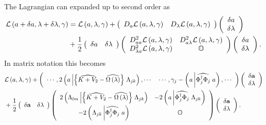 \documentclass[aps,preprint]{revtex4}%
\begin{document}
The Lagrangian can expanded up to second order as
\begin{align}
\mathcal{L}\left(  a+\delta a,\lambda+\delta\lambda,\gamma\right)   &
=\mathcal{L}\left(  a,\lambda,\gamma\right)  +\left(
\begin{array}
[c]{cc}%
D_{a}\mathcal{L}\left(  a,\lambda,\gamma\right)  & D_{\lambda}\mathcal{L}%
\left(  a,\lambda,\gamma\right)
\end{array}
\right)  \left(
\begin{array}
[c]{c}%
\delta a\\
\delta\lambda
\end{array}
\right) \nonumber\\
&  +\frac{1}{2}\left(
\begin{array}
[c]{cc}%
\delta a & \delta\lambda
\end{array}
\right)  \left(
\begin{array}
[c]{cc}%
D_{aa}^{2}\mathcal{L}\left(  a,\lambda,\gamma\right)  & D_{a\lambda}%
^{2}\mathcal{L}\left(  a,\lambda,\gamma\right) \\
D_{\lambda a}^{2}\mathcal{L}\left(  a,\lambda,\gamma\right)  & \mathbb{O}%
\end{array}
\right)  \left(
\begin{array}
[c]{c}%
\delta a\\
\delta\lambda
\end{array}
\right)  .
\end{align}
In matrix notation this becomes
\begin{align}
&  \mathcal{L}\left(  a,\lambda,\gamma\right)  +\left(
\begin{array}
[c]{cc}%
\cdots,2\left(  a\left\vert \left\{  \widehat{K+V_{2}}-\widehat{\Omega\left(
\lambda\right)  }\right\}  \right.  \Lambda_{jk}\right)  ,\cdots &
\cdots,\gamma_{j}-\left(  a\left\vert \widehat{\Phi_{j}^{\dagger}\Phi_{j}%
}\right.  a\right)  ,\cdots
\end{array}
\right)  \left(
\begin{array}
[c]{c}%
\delta\mathbf{a}\\
\delta\mathbf{\lambda}%
\end{array}
\right) \nonumber\\
&  +\frac{1}{2}\left(
\begin{array}
[c]{cc}%
\delta\mathbf{a} & \delta\mathbf{\lambda}%
\end{array}
\right)  \left(
\begin{array}
[c]{cc}%
2\left(  \Lambda_{lm}\left\vert \left\{  \widehat{K+V_{2}}-\widehat
{\Omega\left(  \lambda\right)  }\right\}  \right.  \Lambda_{jk}\right)  &
-2\left(  a\left\vert \widehat{\Phi_{j}^{\dagger}\Phi_{j}}\right.
\Lambda_{jk}\right) \\
-2\left(  \Lambda_{jk}\left\vert \widehat{\Phi_{j}^{\dagger}\Phi_{j}}\right.
a\right)  & \mathbb{O}%
\end{array}
\right)  \left(
\begin{array}
[c]{c}%
\delta\mathbf{a}\\
\delta\mathbf{\lambda}%
\end{array}
\right)  .
\end{align}
\end{document}
